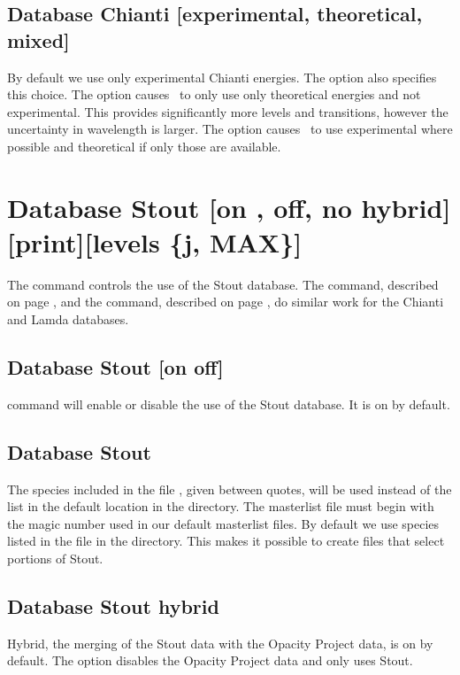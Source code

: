 \subsection{Database Chianti [experimental, theoretical, mixed]}
\label{sec:AtomChiantiExperimental}
By default we use only experimental Chianti energies.
The  option also specifies this choice.
The  option causes \Cloudy\ to only use only theoretical 
energies and not experimental.
This provides significantly more levels and transitions, 
however the uncertainty in wavelength is larger.
The  option causes \Cloudy\ to use experimental where
possible and theoretical if only those are available.

\section{Database Stout [on , off, no hybrid][print][levels \{j, MAX\}]}
\label{sec:SetStout}
The command controls the use of the Stout database.
The  command, described on page \pageref{sec:SetChianti},
and the  command, described on page \pageref{sec:SetLamda},
do similar work for the Chianti and Lamda databases.

\subsection{Database Stout [on off]} 
command will enable or disable the use of the Stout database.
It is on by default.

\subsection{Database Stout }
The species included in the file , given between quotes, will be used
instead of the list in the default location in the  directory.
The masterlist file must begin with the magic number used in our default masterlist files.
By default we use species listed in the  file in the 
 directory.
This makes it possible to create  files that select portions of Stout.

\subsection{Database Stout hybrid} 
Hybrid, the merging of the Stout data with the Opacity Project data, 
is on by default.
The  option disables the Opacity Project data 
and only uses Stout.

